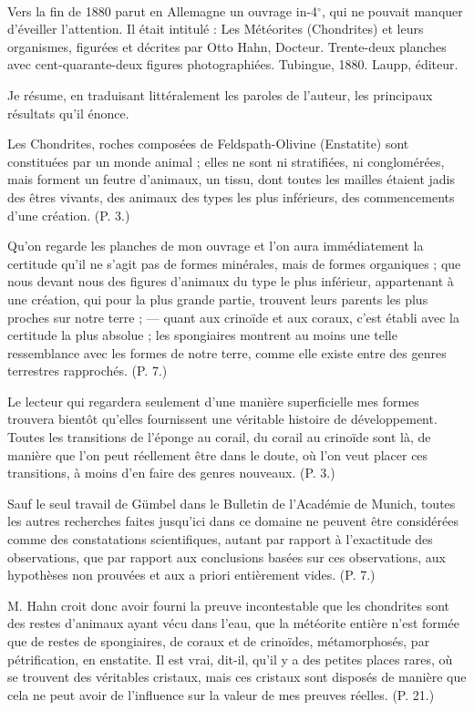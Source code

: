 \documentclass[a4paper, 12pt, oneside, french]{book}
\begin{document}
\paragraph{}
Vers la fin de 1880 parut en Allemagne un ouvrage in-4$^{\circ}$, qui ne pouvait manquer d'éveiller l'attention. Il était intitulé : Les Météorites (Chondrites) et leurs organismes, figurées et décrites par Otto Hahn, Docteur. Trente-deux planches avec cent-quarante-deux figures photographiées. Tubingue, 1880. Laupp, éditeur.

Je résume, en traduisant littéralement les paroles de l'auteur, les principaux résultats qu'il énonce.

\og Les Chondrites, roches composées de Feldspath-Olivine (Enstatite) sont constituées par un monde animal ; elles ne sont ni stratifiées, ni conglomérées, mais forment un feutre d'animaux, un tissu, dont toutes les mailles étaient jadis des êtres vivants, des animaux des types les plus inférieurs, des commencements d'une création. \fg (P. 3.)

\og Qu'on regarde les planches de mon ouvrage et l'on aura immédiatement la certitude qu'il ne s'agit pas de formes minérales, mais de formes organiques ; que nous devant nous des figures d'animaux du type le plus inférieur, appartenant à une création, qui pour la plus grande partie, trouvent leurs parents les plus proches sur notre terre ; --- quant aux crinoïde et aux coraux, c'est établi avec la certitude la plus absolue ; les spongiaires montrent au moins une telle ressemblance avec les formes de notre terre, comme elle existe entre des genres terrestres rapprochés. \fg (P. 7.)

\og Le lecteur qui regardera seulement d'une manière superficielle mes formes trouvera bientôt qu'elles fournissent une véritable histoire de développement. Toutes les transitions de l'éponge au corail, du corail au crinoïde sont là, de manière que l'on peut réellement être dans le doute, où l'on veut placer ces transitions, à moins d'en faire des genres nouveaux. \fg (P. 3.)

\og Sauf le seul travail de Gümbel dans le Bulletin de l'Académie de Munich, toutes les autres recherches faites jusqu'ici dans ce domaine ne peuvent être considérées comme des constatations scientifiques, autant par rapport à l'exactitude des observations, que par rapport aux conclusions basées sur ces observations, aux hypothèses non prouvées et aux a priori entièrement vides. \fg (P. 7.)

M. Hahn croit donc avoir fourni \og la preuve incontestable que les chondrites sont des restes d'animaux ayant vécu dans l'eau, que la météorite entière n'est formée que de restes de spongiaires, de coraux et de crinoïdes, métamorphosés, par pétrification, en enstatite. Il est vrai, dit-il, qu'il y a des petites places rares, où se trouvent des véritables cristaux, mais ces cristaux sont disposés de manière que cela ne peut avoir de l'influence sur la valeur de mes preuves réelles. \fg (P. 21.)
\end{document}
